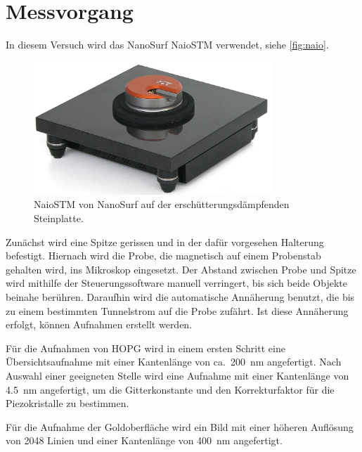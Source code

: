 \section{Messvorgang}
 
In diesem Versuch wird das NanoSurf NaioSTM verwendet, siehe \autoref{fig:naio}.
\begin{figure}
  \centering
  \includegraphics[width=0.8\textwidth]{./images/naiostm-zoom.jpg}
  \caption{%
    NaioSTM von NanoSurf auf der erschütterungsdämpfenden Steinplatte.~\cite{naio}
  }\label{fig:naio}
\end{figure}

Zunächst wird eine Spitze gerissen und in der dafür vorgesehen Halterung befestigt.
Hiernach wird die Probe, die magnetisch auf einem Probenstab gehalten wird, ins Mikroskop eingesetzt.
Der Abstand zwischen Probe und Spitze wird mithilfe der Steuerungssoftware manuell verringert, bis sich beide Objekte beinahe berühren.
Daraufhin wird die automatische Annäherung benutzt, die bis zu einem bestimmten Tunnelstrom auf die Probe zufährt.
Ist diese Annäherung erfolgt, können Aufnahmen erstellt werden.

Für die Aufnahmen von HOPG wird in einem ersten Schritt eine Übersichtsaufnahme mit einer Kantenlänge von ca.\ \SI{200}{\nano\meter} angefertigt.
Nach Auswahl einer geeigneten Stelle wird eine Aufnahme mit einer Kantenlänge von \SI{4.5}{\nano\meter} angefertigt, um die Gitterkonstante und den Korrekturfaktor für die Piezokristalle zu bestimmen.

Für die Aufnahme der Goldoberfläche wird ein Bild mit einer höheren Auflösung von \num{2048} Linien und einer Kantenlänge von \SI{400}{\nano\meter} angefertigt.
